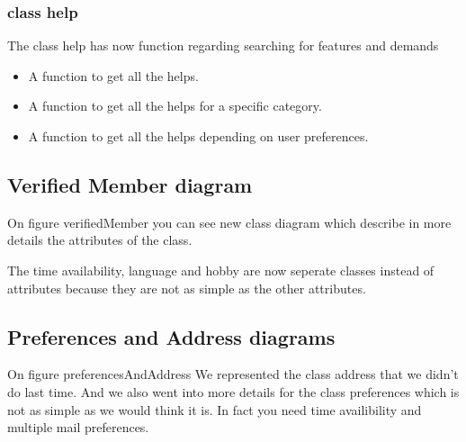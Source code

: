\documentclass[11pt, a4paper]{article}   	%
\begin{document}
\subsubsection{class help}

The class help has now function regarding searching for features and demands
\begin{itemize}
\item A function to get all the helps.
\item A function to get all the helps for a specific category.
\item A function to get all the helps depending on user preferences.
\end{itemize}

\subsection{Verified Member diagram}


On figure {verifiedMember} you can see new class diagram which describe in more details the attributes of the class.

The time availability, language and hobby are now seperate classes instead of attributes because they are not as simple as the other
attributes. 

\subsection{Preferences and Address diagrams}


On figure {preferencesAndAddress} We represented the class address that we didn't do last time. And we also went into more details
for the class preferences which is not as simple as we would think it is. In fact you need time availibility and multiple mail preferences.
\end{document}
